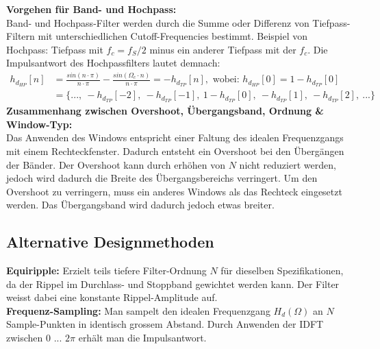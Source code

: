 \textbf{Vorgehen für Band- und Hochpass:\\}
Band- und Hochpass-Filter werden durch die Summe oder Differenz von Tiefpass-Filtern
mit unterschiedlichen Cutoff-Frequencies bestimmt. Beispiel von Hochpass: Tiefpass mit 
$f_c = f_S/2$ minus ein anderer Tiefpass mit der $f_c$. Die Impulsantwort des 
Hochpassfilters lautet demnach:
\begin{align*}
	h_{d_{HP}}[n]&= \frac{sin(n \cdot \pi)}{n \cdot \pi} - \frac{sin(\Omega_c \cdot n)}{n \cdot \pi} 
	= -h_{d_{TP}}[n], \text{ wobei: } h_{d_{HP}}[0]= 1 - h_{d_{TP}}[0]  \\
	&=\{ ...,\ -h_{d_{TP}}[-2],\ -h_{d_{TP}}[-1],\ 1-h_{d_{TP}}[0],\ -h_{d_{TP}}[1],\ -h_{d_{TP}}[2],\ ... \} 
\end{align*}
\textbf{Zusammenhang zwischen Overshoot, Übergangsband, Ordnung \& Window-Typ:\\}
Das Anwenden des Windows entspricht einer Faltung des idealen Frequenzgangs mit
einem Rechteckfenster. Dadurch entsteht ein Overshoot bei den Übergängen der Bänder. 
Der Overshoot kann durch erhöhen von $N$ nicht reduziert werden, jedoch wird dadurch 
die Breite des Übergangsbereichs verringert. Um den Overshoot zu verringern, muss 
ein anderes Windows als das Rechteck eingesetzt werden. Das Übergangsband wird dadurch
jedoch etwas breiter.
\subsection{Alternative Designmethoden}
\textbf{Equiripple:} Erzielt teils tiefere Filter-Ordnung $N$ für dieselben Spezifikationen,
da der Rippel im Durchlass- und Stoppband gewichtet werden kann. Der Filter weisst dabei  
eine konstante Rippel-Amplitude auf.\\
\textbf{Frequenz-Sampling:} Man sampelt den idealen Frequenzgang $H_d(\Omega)$ an $N$ 
Sample-Punkten in identisch grossem Abstand. Durch Anwenden der IDFT zwischen 0 ... $2\pi$
erhält man die Impulsantwort.
